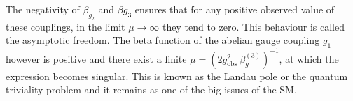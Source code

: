 \documentclass[11pt, a4paper]{article}
\newcommand{\jhkbf}[1]{\textbf{\color{red} [#1]}}
\newcommand{\jhkbf}[1]{\textbf{\color{red} [#1]}}
\begin{document}
The negativity of $\beta_{g_2}$ and $\beta{g_3}$ ensures that for any positive observed value of these couplings, in the limit $\mu \rightarrow \infty$ they tend to zero. This behaviour is called the asymptotic freedom.
The beta function of the abelian gauge coupling $g_1$ however is positive and
there exist a finite $\mu= \left(2 g_{\text{obs}}^2 \ \beta_{g}^{(3)} \right)^{-1} $, at which the expression becomes singular.
This is known as the Landau pole or the quantum triviality problem and
it remains as one of the big issues of the SM.


\end{document}

